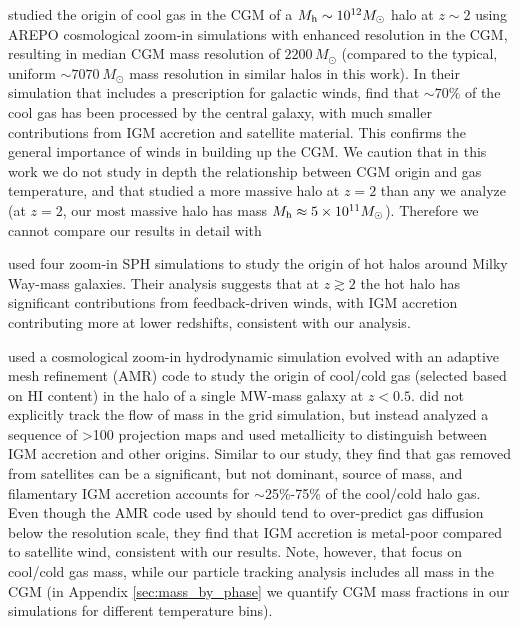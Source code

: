 \documentclass[fleqn,usenatbib]{mnras}
\begin{document}
\cite{Suresh2018} studied the origin of cool gas in the CGM of a $M_{\rm h} \sim 10^{12} M_\odot$ halo at $z \sim 2$ using AREPO cosmological zoom-in simulations with enhanced resolution in the CGM, resulting in median CGM mass resolution of $2200\,M_\odot$ (compared to the typical, uniform $\sim7070~M_\odot$ mass resolution in similar halos in this work).
In their simulation that includes a prescription for galactic winds, \citeauthor{Suresh2018} find that $\sim 70\%$ of the cool gas has been processed by the central galaxy, with much smaller contributions from IGM accretion and satellite material. 
This confirms the general importance of winds in building up the CGM. 
We caution that in this work we do not study in depth the relationship between CGM origin and gas temperature, and that \citeauthor{Suresh2018} studied a more massive halo at $z=2$ than any we analyze (at $z=2$, our most massive halo has mass $M_{\rm h} \approx 5 \times 10^{11} M_\odot$). 
Therefore we cannot compare our results in detail with \citeauthor{Suresh2018}

\cite{Sokolowska2017} used four zoom-in SPH simulations to study the origin of hot halos around Milky Way-mass galaxies.
Their analysis suggests that at $z \gtrsim 2$ the hot halo has significant contributions from feedback-driven winds, with IGM accretion contributing more at lower redshifts, consistent with our analysis.

\cite{Fernandez2012} used a cosmological zoom-in hydrodynamic simulation evolved with an adaptive mesh refinement (AMR) code to study the origin of cool/cold gas (selected based on HI content) in the halo of a single MW-mass galaxy at $z<0.5$.
\citeauthor{Fernandez2012} did not explicitly track the flow of mass in the grid simulation, but instead analyzed a sequence of >100 projection maps and used metallicity to distinguish between IGM accretion and other origins.
Similar to our study, they find that gas removed from satellites can be a significant, but not dominant, source of mass, and filamentary IGM accretion accounts for $\sim$25\%-75\% of the cool/cold halo gas. 
Even though the AMR code used by \cite{Fernandez2012} should tend to over-predict gas diffusion below the resolution scale, they find that IGM accretion is metal-poor compared to satellite wind, consistent with our results.
Note, however, that \citeauthor{Fernandez2012} focus on cool/cold gas mass, while our particle tracking analysis includes all mass in the CGM (in Appendix \ref{sec:mass_by_phase} we quantify CGM mass fractions in our simulations for different temperature bins).
\end{document}
